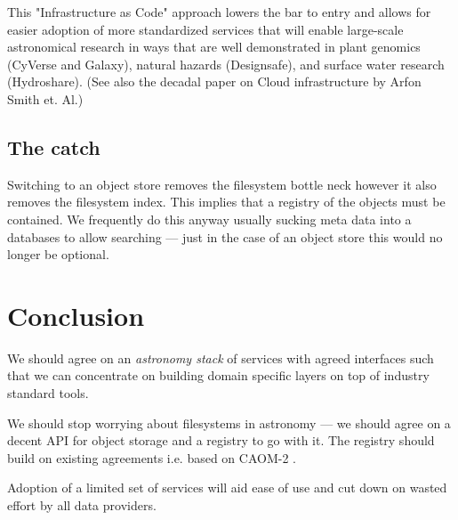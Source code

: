This "Infrastructure as Code" \citep{morris2016infrastructure} approach lowers the bar to entry
and allows for easier adoption of more standardized services that will enable large-scale
astronomical research in ways that are well demonstrated in plant genomics (CyVerse and Galaxy), natural hazards (Designsafe), and surface water research (Hydroshare). (See also the decadal paper on Cloud infrastructure by Arfon Smith et. Al.)

\subsection{The catch }
Switching to an object store removes the filesystem bottle neck however it also removes the filesystem index. This implies that a registry of the objects must be contained. We frequently do this anyway usually sucking meta data into a databases to allow searching --- just in the case of an object store this would no longer be  optional.


\section{Conclusion}
We should agree on an \emph{astronomy \gls{stack}} of services with agreed interfaces such that we can concentrate on building domain specific layers on top of industry standard tools.

We should stop worrying about filesystems in astronomy --- we should agree on a decent \gls{API} for object storage and a registry to go with it.
The registry should build on existing agreements i.e. based on \gls{CAOM}-2 \citep{2007ASPC..376..347D}.

Adoption of  a limited set of  services will  aid ease of use and cut down on wasted effort by all data providers.
